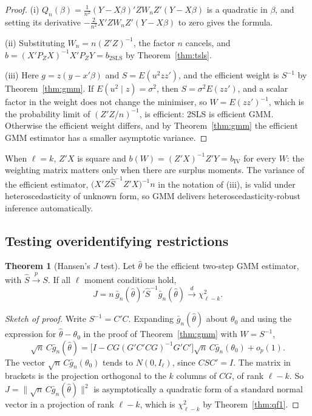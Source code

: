 \documentclass[11pt,a4paper]{article}
\numberwithin{equation}{section}
\theoremstyle{definition}
\newtheorem{thm}{Theorem}[subsection]
\begin{document}
\begin{proof}
(i) $Q_n(\beta) = \frac{1}{n^2}(Y - X\beta)'ZW_nZ'(Y - X\beta)$ is a quadratic in $\beta$, and setting its derivative $-\frac{2}{n^2}X'ZW_nZ'(Y - X\beta)$ to zero gives the formula.

(ii) Substituting $W_n = n(Z'Z)^{-1}$, the factor $n$ cancels, and $b = (X'P_ZX)^{-1}X'P_ZY = b_{\text{2SLS}}$ by Theorem~\ref{thm:tsls}.

(iii) Here $g = z(y - x'\beta)$ and $S = E(u^2zz')$, and the efficient weight is $S^{-1}$ by Theorem~\ref{thm:gmm}. If $E(u^2 \mid z) = \sigma^2$, then $S = \sigma^2E(zz')$, and a scalar factor in the
weight does not change the minimiser, so $W = E(zz')^{-1}$, which is the probability limit of $(Z'Z/n)^{-1}$, is efficient: 2SLS is efficient GMM. Otherwise the efficient weight
differs, and by Theorem~\ref{thm:gmm} the efficient GMM estimator has a smaller asymptotic variance.
\end{proof}

When $\ell = k$, $Z'X$ is square and $b(W) = (Z'X)^{-1}Z'Y = b_{\text{IV}}$ for every $W$: the weighting matrix matters only when there are surplus moments. The variance of the
efficient estimator, $\bigl(X'Z\hat S^{-1}Z'X\bigr)^{-1}n$ in the notation of (iii), is valid under heteroscedasticity of unknown form, so GMM delivers heteroscedasticity-robust
inference automatically.

\subsection{Testing overidentifying restrictions}
\label{ssec:jtest}

\begin{thm}[Hansen's $J$ test]
\label{thm:jtest}
Let $\hat\theta$ be the efficient two-step GMM estimator, with $\hat S \xrightarrow{p} S$. If all $\ell$ moment conditions hold,
\[
J = n\,\bar g_n(\hat\theta)'\hat S^{-1}\bar g_n(\hat\theta) \xrightarrow{d} \chi^2_{\ell - k} .
\]
\end{thm}

\begin{proof}[Sketch of proof]
Write $S^{-1} = C'C$. Expanding $\bar g_n(\hat\theta)$ about $\theta_0$ and using the expression for $\hat\theta - \theta_0$ in the proof of Theorem~\ref{thm:gmm} with $W = S^{-1}$,
\[
\sqrt n\,C\bar g_n(\hat\theta) = \bigl[I - CG(G'C'CG)^{-1}G'C'\bigr]\sqrt n\,C\bar g_n(\theta_0) + o_p(1) .
\]
The vector $\sqrt n\,C\bar g_n(\theta_0)$ tends to $N(0, I_\ell)$, since $CSC' = I$. The matrix in brackets is the projection orthogonal to the $k$ columns of $CG$, of rank $\ell - k$. So
$J = \|\sqrt n\,C\bar g_n(\hat\theta)\|^2$ is asymptotically a quadratic form of a standard normal vector in a projection of rank $\ell - k$, which is $\chi^2_{\ell - k}$ by Theorem~\ref{thm:qf1}.
\end{proof}
\end{document}
